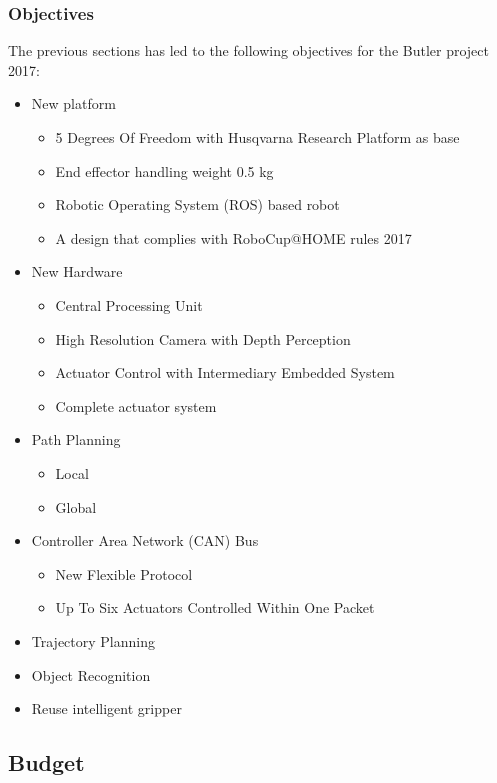 \subsubsection{Objectives}
The previous sections has led to the following objectives for the Butler project 2017:

\begin{itemize}
    \item New platform
        \begin{itemize}
            \item 5 Degrees Of Freedom with Husqvarna Research Platform as base
            \item End effector handling weight 0.5 kg
            \item Robotic Operating System (ROS) based robot
            \item A design that complies with RoboCup@HOME rules 2017
        \end{itemize}
    \item New Hardware
        \begin{itemize}
            \item Central Processing Unit
            \item High Resolution Camera with Depth Perception
            \item Actuator Control with Intermediary Embedded System
            \item Complete actuator system
        \end{itemize}
    \item Path Planning
        \begin{itemize}
            \item Local
            \item Global
        \end{itemize}
    \item Controller Area Network (CAN) Bus
        \begin{itemize}
            \item New Flexible Protocol
            \item Up To Six Actuators Controlled Within One Packet
        \end{itemize}
    \item Trajectory Planning
    \item Object Recognition
    \item Reuse intelligent gripper
\end{itemize}

\subsection{Budget}


